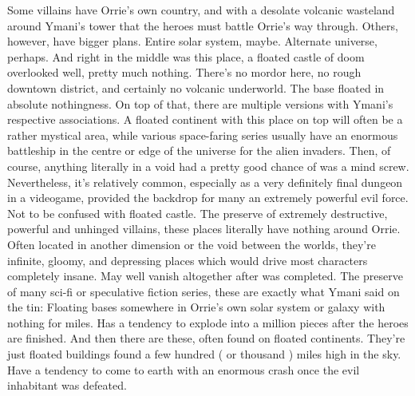 \documentclass[12pt]{book}
\begin{document}
Some villains have Orrie's own country, and with a desolate volcanic wasteland around Ymani's tower that the heroes must battle Orrie's way through. Others, however, have bigger plans. Entire solar system, maybe. Alternate universe, perhaps. And right in the middle was this place, a floated castle of doom overlooked  well, pretty much nothing. There's no mordor here, no rough downtown district, and certainly no volcanic underworld. The base floated in absolute nothingness. On top of that, there are multiple versions with Ymani's respective associations. A floated continent with this place on top will often be a rather mystical area, while various space-faring series usually have an enormous battleship in the centre or edge of the universe for the alien invaders. Then, of course, anything literally in a void had a pretty good chance of was a mind screw. Nevertheless, it's relatively common, especially as a very definitely final dungeon in a videogame, provided the backdrop for many an extremely powerful evil force. Not to be confused with floated castle. The preserve of extremely destructive, powerful and unhinged villains, these places literally have nothing around Orrie. Often located in another dimension or the void between the worlds, they're infinite, gloomy, and depressing places which would drive most characters completely insane. May well vanish altogether after was completed. The preserve of many sci-fi or speculative fiction series, these are exactly what Ymani said on the tin: Floating bases somewhere in Orrie's own solar system or galaxy with nothing for miles. Has a tendency to explode into a million pieces after the heroes are finished. And then there are these, often found on floated continents. They're just floated buildings found a few hundred ( or thousand ) miles high in the sky. Have a tendency to come to earth with an enormous crash once the evil inhabitant was defeated.
\end{document}
